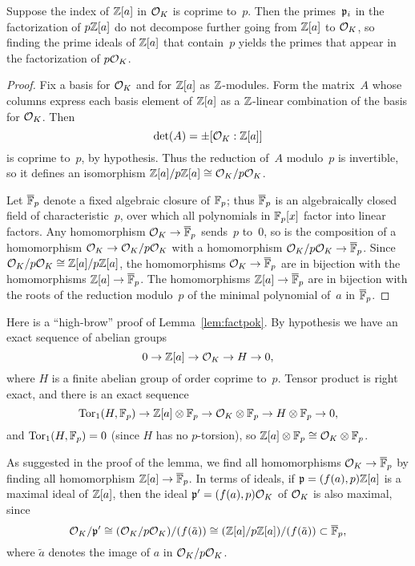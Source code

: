 \begin{lemma}\label{lem:factpok}
	Suppose the index of $\mathbb{Z}[a]$ in $\mathcal{O}_K$ is coprime to~$p$.
	Then the primes~$\mathfrak{p}_i$ in the factorization of $p\mathbb{Z}[a]$ do not
	decompose further going from $\mathbb{Z}[a]$ to $\mathcal{O}_K$, so finding the
	prime ideals of $\mathbb{Z}[a]$ that contain~$p$ yields the primes
	that appear in the factorization of $p\mathcal{O}_K$.
\end{lemma}
\begin{proof}
	Fix a basis for $\mathcal{O}_K$ and for $\mathbb{Z}[a]$ as $\mathbb{Z}$-modules.
	Form the matrix~$A$ whose columns express each basis element
	of $\mathbb{Z}[a]$ as a $\mathbb{Z}$-linear combination of the basis for $\mathcal{O}_K$.
	Then
	$$
		\det(A) = \pm [\mathcal{O}_K:\mathbb{Z}[a]]
	$$
	is coprime to~$p$, by hypothesis. Thus the reduction of~$A$
	modulo~$p$ is invertible, so it defines an isomorphism
	$\mathbb{Z}[a]/p\mathbb{Z}[a] \cong \mathcal{O}_K/p\mathcal{O}_K$.

	Let $\overline{\mathbb{F}}_p$ denote a fixed algebraic closure of $\mathbb{F}_p$; thus $\overline{\mathbb{F}}_p$
	is an algebraically closed field of characteristic~$p$, over which
	all polynomials in $\mathbb{F}_p[x]$ factor into linear factors.
	Any homomorphism $\mathcal{O}_K\to \overline{\mathbb{F}}_p$ sends~$p$ to~$0$, so is the composition
	of a homomorphism $\mathcal{O}_K \to \mathcal{O}_K/p\mathcal{O}_K$ with a homomorphism
	$\mathcal{O}_K/p\mathcal{O}_K \to \overline{\mathbb{F}}_p$. Since $\mathcal{O}_K/p\mathcal{O}_K \cong \mathbb{Z}[a]/p\mathbb{Z}[a]$, the
	homomorphisms $\mathcal{O}_K\to \overline{\mathbb{F}}_p$ are in bijection with the homomorphisms
	$\mathbb{Z}[a]\to \overline{\mathbb{F}}_p$. The homomorphisms $\mathbb{Z}[a]\to\overline{\mathbb{F}}_p$ are in bijection
	with the roots of the reduction modulo~$p$ of the minimal polynomial
	of~$a$ in $\overline{\mathbb{F}}_p$.
\end{proof}

\begin{remark}
	Here is a ``high-brow'' proof of Lemma~\ref{lem:factpok}.
	By hypothesis we have an exact sequence of abelian groups
	$$
		0 \to \mathbb{Z}[a]\to \mathcal{O}_K \to H \to 0,
	$$
	where $H$ is a finite abelian group of order coprime to~$p$.
	Tensor product is right exact, and there is an exact sequence
	$$
	   \operatorname{Tor}_1(H,\mathbb{F}_p) \to \mathbb{Z}[a]\otimes\mathbb{F}_p \to \mathcal{O}_K\otimes\mathbb{F}_p \to H\otimes\mathbb{F}_p \to 0,
	$$
	and $\operatorname{Tor}_1(H,\mathbb{F}_p) = 0$ (since $H$ has no $p$-torsion),
	so $\mathbb{Z}[a]\otimes\mathbb{F}_p\cong \mathcal{O}_K\otimes\mathbb{F}_p$.
\end{remark}

As suggested in the proof of the lemma, we find all homomorphisms
$\mathcal{O}_K\to \overline{\mathbb{F}}_p$ by finding all homomorphism $\mathbb{Z}[a]\to \overline{\mathbb{F}}_p$.  In
terms of ideals, if $\mathfrak{p} = (f(a),p)\mathbb{Z}[a]$ is a maximal ideal of $\mathbb{Z}[a]$,
then the ideal $\mathfrak{p}' = (f(a),p)\mathcal{O}_K$ of $\mathcal{O}_K$ is also maximal, since
$$
	\mathcal{O}_K/\mathfrak{p}'\cong (\mathcal{O}_K/p\mathcal{O}_K)/(f(\tilde{a}))
	\cong
	(\mathbb{Z}[a]/p\mathbb{Z}[a]) / (f(\tilde{a})) \subset \overline{\mathbb{F}}_p,
$$
where $\tilde{a}$ denotes the image of $a$ in $\mathcal{O}_K/p\mathcal{O}_K$.

